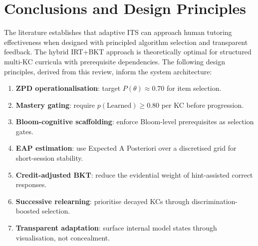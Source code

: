 \section{Conclusions and Design Principles}
\label{sec:lr_conclusion}

The literature establishes that adaptive ITS can approach human tutoring
effectiveness when designed with principled algorithm selection and transparent
feedback. The hybrid IRT+BKT approach is theoretically optimal for structured
multi-KC curricula with prerequisite dependencies. The following design
principles, derived from this review, inform the system architecture:

\begin{enumerate}[leftmargin=2em]
  \item \textbf{ZPD operationalisation}: target $P(\theta) \approx 0.70$ for item selection.
  \item \textbf{Mastery gating}: require $p(\text{Learned}) \geq 0.80$ per KC before progression.
  \item \textbf{Bloom-cognitive scaffolding}: enforce Bloom-level prerequisites as selection gates.
  \item \textbf{EAP estimation}: use Expected A Posteriori over a discretised grid for short-session stability.
  \item \textbf{Credit-adjusted BKT}: reduce the evidential weight of hint-assisted correct responses.
  \item \textbf{Successive relearning}: prioritise decayed KCs through discrimination-boosted selection.
  \item \textbf{Transparent adaptation}: surface internal model states through visualisation, not concealment.
\end{enumerate}
